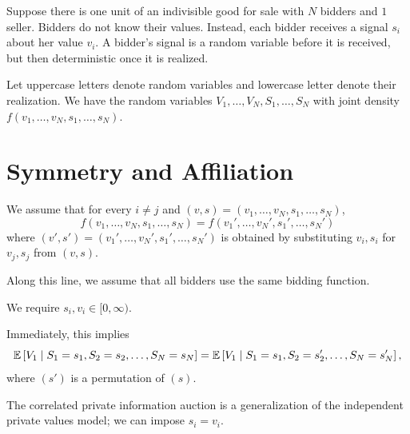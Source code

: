 
Suppose there is one unit of an indivisible good for sale with $N$ bidders and $1$ seller. Bidders do not know their values. Instead, each bidder receives a signal $s_i$ about her value $v_i$. A bidder's signal is a random variable before it is received, but then deterministic once it is realized.

Let uppercase letters denote random variables and lowercase letter denote their realization. We have the random variables $V_1,\ldots,V_N,S_1,\ldots,S_N$ with joint density $	f(v_1,\ldots,v_N, s_1,\ldots,s_N)$.

\section{Symmetry and Affiliation}

\begin{assumption}[Symmetry]
	We assume that for every $i \ne j$ and $\left( v,s \right)= \left( v_1,\ldots,v_N, s_1,\ldots,s_N \right)$, \[
		f(v_1,\ldots,v_N, s_1,\ldots,s_N) = f(v_1',\ldots,v_N',s_1',\ldots,s_N')
	\] where $(v',s') = (v_1',\ldots,v_N',s_1',\ldots,s_N')$ is obtained by substituting $v_i, s_i$ for $v_j,s_j$ from $(v,s)$.

	Along this line, we assume that all bidders use the same bidding function.
\end{assumption}

\begin{assumption}
	We require $s_i,v_i \in [0,\infty)$.
\end{assumption}

Immediately, this implies \[
	\mathbb{E}\left[V_1 \mid S_1 = s_1, S_2=  s_2, \ldots, S_N = s_N\right]  = \mathbb{E}\left[V_1 \mid S_1 = s_1, S_2 = s_2', \ldots,S_N = s_N'\right] 
,\] where $(s')$ is a permutation of $(s)$.

\begin{remark}	The correlated private information auction is a generalization of the independent private values model; we can impose $s_i = v_i$.
\end{remark}

